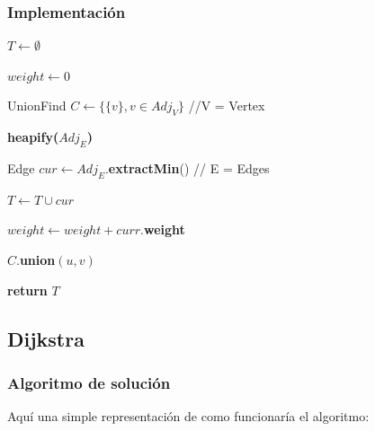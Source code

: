 \documentclass[letterpaper,11pt]{article}
\begin{document}
        \subsubsection{Implementación}
        \begin{algorithm}[H]
            $T \gets \emptyset$

            $weight \gets 0$

            UnionFind $C \gets \{\{v\}, v \in Adj_V \}$ //V = Vertex
            
            \textbf{heapify($Adj_E$)}

            {
                Edge $cur \gets Adj_E.$\textbf{extractMin}() // E = Edges

                {
                    $T \gets T \cup cur$

                    $weight \gets weight + curr.$\textbf{weight}

                    $C.$\textbf{union$(u,v)$}
                }
            }
            \textbf{return} $T$
        \end{algorithm}

    \newpage
    \subsection{Dijkstra}
        \subsubsection{Algoritmo de solución}
            Aquí una simple representación de como funcionaría el algoritmo:
            
\end{document}
